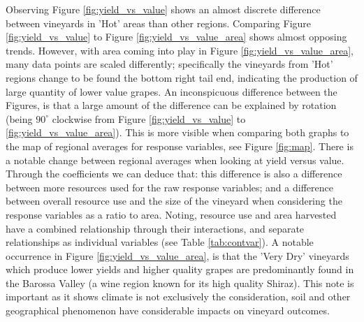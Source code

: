 \documentclass[review,12pt,authoryear]{elsarticle}
\begin{document}
\begin{linenumbers}
\newline
Observing Figure \ref{fig:yield_vs_value} shows an almost discrete difference between vineyards in 'Hot' areas than other regions. Comparing Figure \ref{fig:yield_vs_value} to Figure \ref{fig:yield_vs_value_area} shows almost opposing trends. However, with area coming into play in Figure \ref{fig:yield_vs_value_area}, many data points are scaled differently; specifically the vineyards from 'Hot' regions change to be found the bottom right tail end, indicating the production of large quantity of lower value grapes. An inconspicuous difference between the Figures, is that a large amount of the difference can be explained by rotation (being $90^\circ$ clockwise from Figure \ref{fig:yield_vs_value} to \ref{fig:yield_vs_value_area}). This is more visible when comparing both graphs to the map of regional averages for response variables, see Figure \ref{fig:map}.
There is a notable change between regional averages when looking at yield versus value. Through the coefficients we can deduce that: this difference is also a difference between more resources used for the raw response variables; and a difference between overall resource use and the size of the vineyard when considering the response variables as a ratio to area. Noting, resource use and area harvested have a combined relationship through their interactions, and separate relationships as individual variables (see Table \ref{tab:contvar}). A notable occurrence in Figure \ref{fig:yield_vs_value_area}, is that the 'Very Dry' vineyards which produce lower yields and higher quality grapes are predominantly found in the Barossa Valley (a wine region known for its high quality Shiraz). This note is important as it shows climate is not exclusively the consideration, soil and other geographical phenomenon have considerable impacts on vineyard outcomes.
%
%
%
%

\end{linenumbers}
\end{document}
